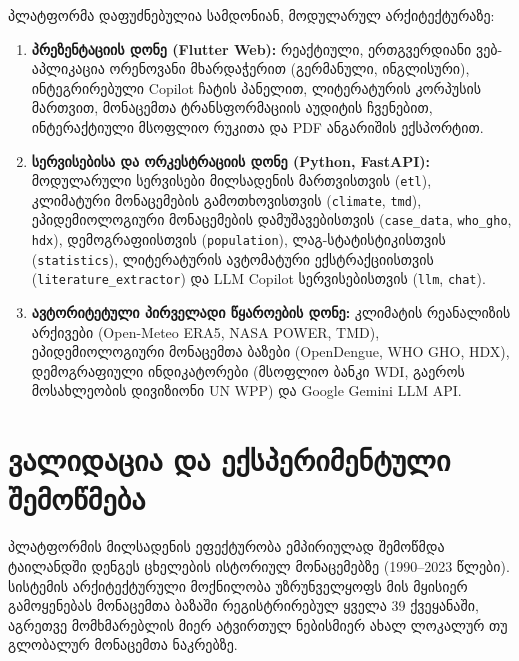 \documentclass[11pt,a4paper]{article}
\begin{document}
პლატფორმა დაფუძნებულია სამდონიან, მოდულარულ არქიტექტურაზე:
\begin{enumerate}[label=(\arabic*)]\sloppy
  \item \textbf{პრეზენტაციის დონე (Flutter Web):} რეაქტიული, ერთგვერდიანი ვებ-აპლიკაცია ორენოვანი მხარდაჭერით (გერმანული, ინგლისური), ინტეგრირებული Copilot ჩატის პანელით, ლიტერატურის კორპუსის მართვით, მონაცემთა ტრანსფორმაციის აუდიტის ჩვენებით, ინტერაქტიული მსოფლიო რუკითა და PDF ანგარიშის ექსპორტით.
  \item \textbf{სერვისებისა და ორკესტრაციის დონე (Python, FastAPI):} მოდულარული სერვისები მილსადენის მართვისთვის (\texttt{etl}), კლიმატური მონაცემების გამოთხოვისთვის (\texttt{climate}, \texttt{tmd}), ეპიდემიოლოგიური მონაცემების დამუშავებისთვის (\texttt{case\_data}, \texttt{who\_gho}, \texttt{hdx}), დემოგრაფიისთვის (\texttt{population}), ლაგ-სტატისტიკისთვის (\texttt{statistics}), ლიტერატურის ავტომატური ექსტრაქციისთვის (\texttt{literature\_extractor}) და LLM Copilot სერვისებისთვის (\texttt{llm}, \texttt{chat}).
  \item \textbf{ავტორიტეტული პირველადი წყაროების დონე:} კლიმატის რეანალიზის არქივები (Open-Meteo ERA5, NASA POWER, TMD), ეპიდემიოლოგიური მონაცემთა ბაზები (OpenDengue, WHO GHO, HDX), დემოგრაფიული ინდიკატორები (მსოფლიო ბანკი WDI, გაეროს მოსახლეობის დივიზიონი UN WPP) და Google Gemini LLM API.
\end{enumerate}

\section{ვალიდაცია და ექსპერიმენტული შემოწმება}

პლატფორმის მილსადენის ეფექტურობა ემპირიულად შემოწმდა ტაილანდში დენგეს ცხელების ისტორიულ მონაცემებზე (1990--2023 წლები). სისტემის არქიტექტურული მოქნილობა უზრუნველყოფს მის მყისიერ გამოყენებას მონაცემთა ბაზაში რეგისტრირებულ ყველა 39 ქვეყანაში, აგრეთვე მომხმარებლის მიერ ატვირთულ ნებისმიერ ახალ ლოკალურ თუ გლობალურ მონაცემთა ნაკრებზე.
\end{document}
